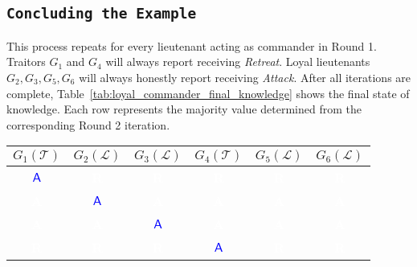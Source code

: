 \documentclass[11pt]{article}
\newcommand{\cmdA}{\ensuremath{\mathsf{A}}} %
\newcommand{\loyal}{\ensuremath{\mathcal{L}}}
\newcommand{\traitor}{\ensuremath{\mathcal{T}}}
\newcommand{\gen}[1]{\ensuremath{G_{#1}}}
\begin{document}
\subsection*{\texttt{\large Concluding the Example}}
\justifying
This process repeats for every lieutenant acting as commander in Round 1. Traitors $\gen{1}$ and $\gen{4}$ will always report receiving \textit{Retreat}. Loyal lieutenants $\gen{2}, \gen{3}, \gen{5}, \gen{6}$ will always honestly report receiving \textit{Attack}. After all iterations are complete, Table~\ref{tab:loyal_commander_final_knowledge} shows the final state of knowledge. Each row represents the majority value determined from the corresponding Round 2 iteration.

\begin{center}
\vspace{1em} %
\renewcommand{\arraystretch}{1.5}
\setlength{\tabcolsep}{6pt} %
\begin{tabular}{c|c|c|c|c|c}
    \hline
    \textbf{$\gen{1}(\traitor)$} & \textbf{$\gen{2}(\loyal)$} & \textbf{$\gen{3}(\loyal)$} & \textbf{$\gen{4}(\traitor)$} & \textbf{$\gen{5}(\loyal)$} & \textbf{$\gen{6}(\loyal)$} \\
    \hline
    \cellcolor{yellow!30}\textbf{\textcolor{blue}{\cmdA}} & \cellcolor{red!75}\textbf{\textcolor{white}{R}} & \cellcolor{red!75}\textbf{\textcolor{white}{R}} & \cellcolor{red!75}\textbf{\textcolor{white}{R}} & \cellcolor{red!75}\textbf{\textcolor{white}{R}} & \cellcolor{red!75}\textbf{\textcolor{white}{R}} \\
    \hline
    \cellcolor{blue!75}\textbf{\textcolor{white}{A}} & \cellcolor{yellow!30}\textbf{\textcolor{blue}{\cmdA}} & \cellcolor{blue!75}\textbf{\textcolor{white}{A}} & \cellcolor{blue!75}\textbf{\textcolor{white}{A}} & \cellcolor{blue!75}\textbf{\textcolor{white}{A}} & \cellcolor{blue!75}\textbf{\textcolor{white}{A}} \\
    \hline
    \cellcolor{blue!75}\textbf{\textcolor{white}{A}} & \cellcolor{blue!75}\textbf{\textcolor{white}{A}} & \cellcolor{yellow!30}\textbf{\textcolor{blue}{\cmdA}} & \cellcolor{blue!75}\textbf{\textcolor{white}{A}} & \cellcolor{blue!75}\textbf{\textcolor{white}{A}} & \cellcolor{blue!75}\textbf{\textcolor{white}{A}} \\
    \hline
    \cellcolor{red!75}\textbf{\textcolor{white}{R}} & \cellcolor{red!75}\textbf{\textcolor{white}{R}} & \cellcolor{red!75}\textbf{\textcolor{white}{R}} & \cellcolor{yellow!30}\textbf{\textcolor{blue}{\cmdA}} & \cellcolor{red!75}\textbf{\textcolor{white}{R}} & \cellcolor{red!75}\textbf{\textcolor{white}{R}} \\

\end{tabular}
\end{center}
\end{document}
